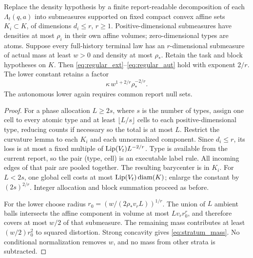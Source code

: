 \begin{proposition}\label{prop:strata}
Replace the density hypothesis by a finite report-readable decomposition of each $\Lambda_t(q,a)$ into submeasures supported on fixed compact convex affine sets $K_i\subset K$, of dimensions $d_i\le r$, $r\ge1$. Positive-dimensional submeasures have densities at most $\rho_i$ in their own affine volumes; zero-dimensional types are atoms. Suppose every full-history terminal law has an $r$-dimensional submeasure of actual mass at least $w>0$ and density at most $\rho_*$. Retain the task and block hypotheses on $K$. Then \eqref{eq:regular_ext}--\eqref{eq:regular_aut} hold with exponent $2/r$. The lower constant retains a factor
\begin{equation}\label{eq:stratum_mass}
 \kappa\,w^{1+2/r}\rho_*^{-2/r}.
\end{equation}
The autonomous lower again requires common report null sets.
\end{proposition}
\begin{proof}
For a phase allocation $L\ge2s$, where $s$ is the number of types, assign one cell to every atomic type and at least $\lfloor L/s\rfloor$ cells to each positive-dimensional type, reducing counts if necessary so the total is at most $L$. Restrict the curvature lemma to each $K_i$ and each unnormalized component. Since $d_i\le r$, its loss is at most a fixed multiple of $\operatorname{Lip}(V_t)L^{-2/r}$. Type is available from the current report, so the pair (type, cell) is an executable label rule. All incoming edges of that pair are pooled together. The resulting barycenter is in $K_i$. For $L<2s$, one global cell costs at most $\operatorname{Lip}(V_t)\operatorname{diam}(K)$; enlarge the constant by $(2s)^{2/r}$. Integer allocation and block summation proceed as before.

For the lower choose radius $r_0=(w/(2\rho_*v_r L))^{1/r}$. The union of $L$ ambient balls intersects the affine component in volume at most $Lv_r r_0^r$, and therefore covers at most $w/2$ of that submeasure. The remaining mass contributes at least $(w/2)r_0^2$ to squared distortion. Strong concavity gives \eqref{eq:stratum_mass}. No conditional normalization removes $w$, and no mass from other strata is subtracted.
\end{proof}
